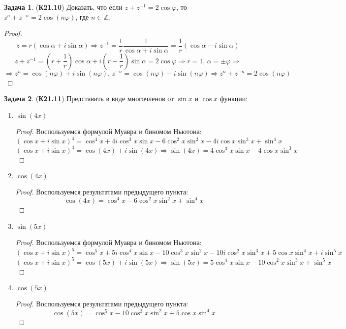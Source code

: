 \documentclass[12pt]{article}
\newcommand{\MZ}{\mathbb{Z}}
\theoremstyle{definition}
\newtheorem{problem}{Задача}
\begin{document}
\begin{problem}(\textbf{К21.10})
	Доказать, что если $z + z^{-1} = 2\cos\varphi$, то $z^n + z^{-n} = 2\cos(n\varphi)$, где $n \in \MZ$.
\end{problem}
\begin{proof}
	$$
		z = r(\cos\alpha + i \sin\alpha) \Rightarrow z^{-1} = \dfrac{1}{r}\dfrac{1}{\cos\alpha + i\sin\alpha} = \dfrac{1}{r}(\cos\alpha - i\sin\alpha)
	$$
	$$
		z + z^{-1} = \left(r + \dfrac{1}{r}\right)\cos\alpha + i\left(r - \dfrac{1}{r}\right)\sin\alpha = 2\cos\varphi \Rightarrow r = 1, \, \alpha = \pm\varphi \Rightarrow
	$$
	$$
		\Rightarrow z^n = \cos(n\varphi) + i\sin(n\varphi), \, z^{-n} = \cos(n\varphi) - i\sin(n\varphi) \Rightarrow z^n + z^{-n} = 2\cos(n\varphi)
	$$
\end{proof}
\begin{problem}(\textbf{К21.11})
	Представить в виде многочленов от $\sin{x}$ и $\cos{x}$ функции:
	\begin{enumerate}[label=\asbuk*)]
		\item $\sin(4x)$
		\begin{proof}
			Воспользуемся формулой Муавра и биномом Ньютона:
			$$
				(\cos{x} + i\sin{x})^4 = \cos^4x + 4i\cos^3{x}\sin{x} -6\cos^2{x}\sin^2{x} -4i\cos{x}\sin^3{x} +\sin^4{x}
			$$
			$$
				(\cos{x} + i\sin{x})^4 = \cos(4x) + i\sin(4x) \Rightarrow \sin(4x) = 4\cos^3{x}\sin{x} - 4\cos{x}\sin^3{x} 
			$$
		\end{proof}
		\item $\cos(4x)$
		\begin{proof}
			Воспользуемся результатами предыдущего пункта:
			$$
				\cos(4x) = \cos^4x-6\cos^2{x}\sin^2{x}+\sin^4{x}
			$$
		\end{proof}
		\item $\sin(5x)$
		\begin{proof}
			Воспользуемся формулой Муавра и биномом Ньютона:
			$$
				(\cos{x} + i\sin{x})^5 = \cos^5x + 5i\cos^4{x}\sin{x} -10\cos^3{x}\sin^2{x} - 10i\cos^2{x}\sin^3{x} +5\cos{x}\sin^4{x} +i\sin^5{x}
			$$
			$$
				(\cos{x} + i\sin{x})^5 = \cos(5x) + i\sin(5x) \Rightarrow \sin(5x) = 5\cos^4x\sin{x} -10\cos^2{x}\sin^3{x}+\sin^5{x}
			$$
		\end{proof}
		\item $\cos(5x)$
		\begin{proof}
			Воспользуемся результатами предыдущего пункта:
			$$
				\cos(5x) = \cos^5{x} - 10\cos^3{x}\sin^2{x} + 5\cos{x}\sin^4{x}
			$$
		\end{proof}
	\end{enumerate}
\end{problem}
\end{document}

